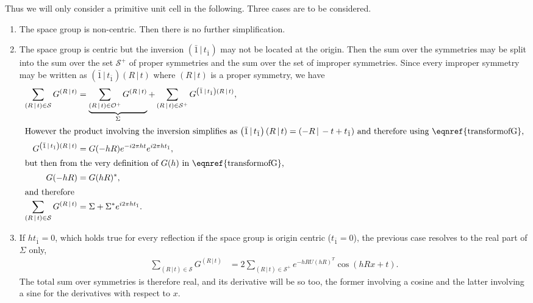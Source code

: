 \documentclass[pdf]{iucr}
\newcommand{\sym}[2]{\left( #1\,\vert\, #2 \right)}
\newcommand{\inversion}{ \sym{\bar{1}}{t_{\bar{1}}} }
\begin{document}
Thus we will only consider a primitive unit cell in the following. Three cases are to be considered.
\begin{enumerate}
\item The space group is non-centric. Then there is no further simplification.
\item The space group is centric but the inversion $\inversion$ may not be located at the origin. Then the sum over the symmetries may be split into the sum over the set $\mathcal{S}^+$ of proper symmetries and the sum over the set of  improper symmetries. Since every improper symmetry may be written as $\inversion\sym{R}{t}$ where $\sym{R}{t}$ is a proper symmetry, we have
\begin{align}
\sum_{\sym{R}{t} \in \mathcal{S}} G^{\sym{R}{t}} &= 
\underbrace{\sum_{\sym{R}{t} \in \cal{O^+}} G^{\sym{R}{t}} }_{\Sigma} 
+ \sum_{\sym{R}{t} \in \mathcal{S}^+} G^{\inversion \sym{R}{t}}, \nonumber \\
\shortintertext{However the product involving the inversion simplifies as 
$\inversion\sym{R}{t} = \sym{-R}{-t + t_{\bar{1}}}$ and therefore using \eqnref{transformofG},}
G^{\inversion\sym{R}{t}} &= G(-hR) e^{-i2\pi ht} e^{i2\pi h t_{\bar{1}}}, \nonumber \\
 \shortintertext{but then from the very definition of $G(h)$ in \eqnref{transformofG},}
 G(-hR) &= G(hR)^*, \\
 \shortintertext{and therefore}
 \sum_{\sym{R}{t} \in \mathcal{S}} G^{\sym{R}{t}} &= \Sigma + \Sigma^* e^{i2\pi h t_{\bar{1}}}.
 \label{eqn:sumofGforcentricgroups}
\end{align}

\item If $h t_{\bar{1}}=0$, which holds true for every reflection if the space group is origin centric ($t_{\bar{1}}=0$), the previous case resolves to the real part of $\Sigma$ only,
\begin{align}
 \sum_{\sym{R}{t} \in \mathcal{S}} G^{\sym{R}{t}} & = 2 \sum_{\sym{R}{t} \in \mathcal{S}^+}  e^{-h R U (hR)^T} \cos(hRx + t).
\end{align}
The total sum over symmetries is therefore real, and its derivative will be so too, the former involving a cosine and the latter involving a sine for the derivatives with respect to $x$. 
\end{enumerate}
\end{document}
